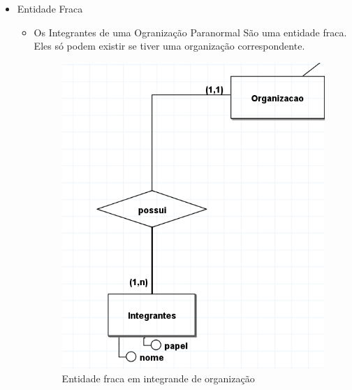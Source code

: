 \documentclass[12pt,a4paper]{report}
\begin{document}
\begin{itemize}
\begin{itemize}
        \item Entidade Fraca
            \begin{itemize}
                \item Os Integrantes de uma Ogranização Paranormal São uma entidade fraca. Eles só podem existir se tiver uma organização correspondente.
                \begin{figure}[H]
                    \centering
                    \includegraphics[width=0.5\linewidth]{entidade_fraca_intg.png}
                    \caption{Entidade fraca em integrande de organização}
                    \label{fig:enter-label}
                \end{figure}
            \end{itemize}
            

\end{itemize}
\end{itemize}
\end{document}
